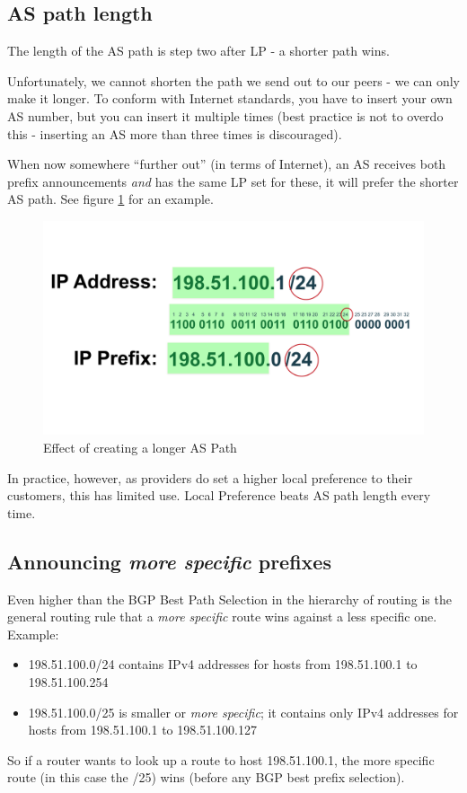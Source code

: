 \subsection{AS path length}
The length of the AS path is step two after \gls{LP} - a shorter path wins.

Unfortunately, we cannot shorten the path we send out to our peers - we can only make it longer. To conform with Internet standards, you have to insert your own AS number, but you can insert it multiple times (best practice is not to overdo this - inserting an AS more than three times is discouraged).

When now somewhere ``further out'' (in terms of Internet), an AS receives both prefix announcements \emph{and} has the same \gls{LP} set for these, it will prefer the shorter AS path. See figure \ref{fig:longerpath} for an example.

\begin{figure}[hb]
  \includegraphics[width=\linewidth,page=13]{img/Drawings.pdf}
  \caption{Effect of creating a longer AS Path}
  \label{fig:longerpath}
\end{figure}

In practice, however, as providers do set a higher local preference to their customers, this has limited use. Local Preference beats AS path length every time.

\subsection{Announcing \emph{more specific} prefixes}
Even higher than the BGP Best Path Selection in the hierarchy of routing is the general routing rule that a \emph{more specific} route wins against a less specific one.
Example:
\begin{itemize}
  \item 198.51.100.0/24 contains IPv4 addresses for hosts from 198.51.100.1 to 198.51.100.254
  \item 198.51.100.0/25 is smaller or \emph{more specific}; it contains only IPv4 addresses for hosts from 198.51.100.1 to 198.51.100.127
\end{itemize}
So if a router wants to look up a route to host 198.51.100.1, the more specific route (in this case the /25) wins (before any BGP best prefix selection).

